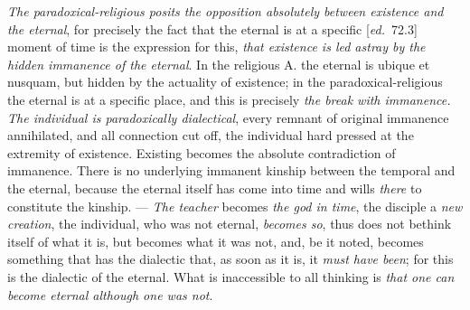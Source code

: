 \documentclass[12pt,a4paper,openany]{book}
\newcommand{\kpage}[1]{\marginnote{\footnotesize\textit{[#1]}}}
\newcommand{\ed}[1]{{\small[\textit{ed.}\ #1]}}
\begin{document}
\emph{The paradoxical-religious posits the opposition absolutely between existence and the
eternal}, for precisely the fact that the eternal is at a specific \ed{72.3} moment of time is
the expression for this, \emph{that existence is led astray by the hidden immanence of the eternal}. In the
religious A. the eternal is ubique et nusquam, but hidden by the actuality
of existence; in the paradoxical-religious the eternal is at a specific
place, and this is precisely \emph{the break with immanence. The individual is paradoxically dialectical},
every remnant of original immanence annihilated, and all connection
cut off, the individual hard pressed at the extremity of existence. Existing
becomes the absolute contradiction of immanence. There is
no underlying immanent kinship between the temporal
and the eternal, because the eternal itself has come into time and wills \emph{there} to constitute
\kpage{148}the kinship. --- \emph{The teacher} becomes \emph{the god in time}, the disciple a \emph{new
creation}, the individual, who was not eternal, \emph{becomes so}, thus does not bethink itself
of what it is, but becomes what it was not, and, be it noted,
becomes something that has the dialectic that, as soon as it is, it \emph{must have
been}; for this is the dialectic of the eternal. What is inaccessible to all thinking
is \emph{that one can become eternal although one was not}.
\end{document}
